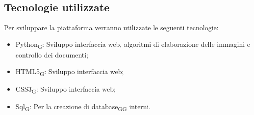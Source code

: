 \subsection{Tecnologie utilizzate}
Per sviluppare la piattaforma verranno utilizzate le seguenti tecnologie:
\begin{itemize}
    \item Python\textsubscript{G}: Sviluppo interfaccia web, algoritmi di elaborazione delle immagini e controllo dei documenti;
    \item HTML5\textsubscript{G}: Sviluppo interfaccia web;
    \item CSS3\textsubscript{G}: Sviluppo interfaccia web;
    \item Sql\textsubscript{G}: Per la creazione di database\textsubscript{G}\textsubscript{G} interni.
\end{itemize}



